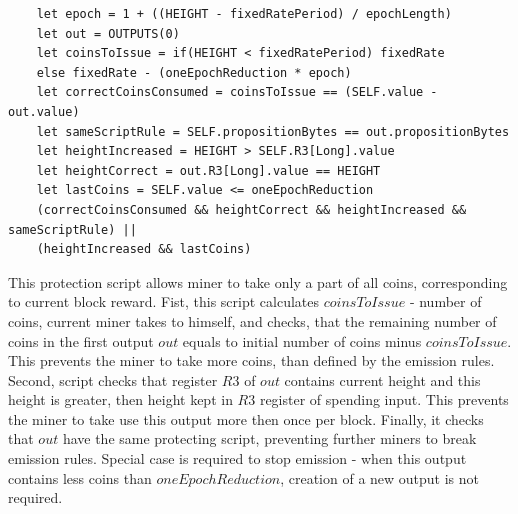 \begin{verbatim}
    let epoch = 1 + ((HEIGHT - fixedRatePeriod) / epochLength)
    let out = OUTPUTS(0)
    let coinsToIssue = if(HEIGHT < fixedRatePeriod) fixedRate
    else fixedRate - (oneEpochReduction * epoch)
    let correctCoinsConsumed = coinsToIssue == (SELF.value - out.value)
    let sameScriptRule = SELF.propositionBytes == out.propositionBytes
    let heightIncreased = HEIGHT > SELF.R3[Long].value
    let heightCorrect = out.R3[Long].value == HEIGHT
    let lastCoins = SELF.value <= oneEpochReduction
    (correctCoinsConsumed && heightCorrect && heightIncreased && sameScriptRule) ||
    (heightIncreased && lastCoins)
\end{verbatim}

This protection script allows miner to take only a part of all coins, corresponding to current block reward.
Fist, this script calculates $coinsToIssue$ - number of coins, current miner takes to himself,
and checks, that the remaining  number of coins in the first output $out$ equals to initial
number of coins minus $coinsToIssue$.
This prevents the miner to take more coins, than defined by the emission rules.
Second, script checks that register $R3$ of $out$ contains current height and this height is greater, then height
kept in $R3$ register of spending input.
This prevents the miner to take use this output more then once per block.
Finally, it checks that $out$ have the same protecting script, preventing further miners to break emission rules.
Special case is required to stop emission - when this output contains less coins than $oneEpochReduction$,
creation of a new output is not required.
